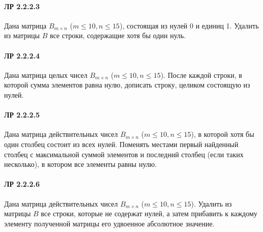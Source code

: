 \documentclass[12pt,a4paper]{report}
\begin{document}
\paragraph*{ЛР 2.2.2.3} Дана матрица $B_{m \times n}$ ($m \le 10, n \le 15$), состоящая из нулей 0 и единиц 1. Удалить из матрицы $B$ все строки, содержащие хотя бы один нуль.
\paragraph*{ЛР 2.2.2.4} Дана матрица целых чисел $B_{m \times n}$ ($m \le 10, n \le 15$). После каждой строки, в которой сумма элементов равна нулю, дописать строку, целиком состоящую из нулей.
\paragraph*{ЛР 2.2.2.5} Дана матрица действительных чисел $B_{m \times n}$ ($m \le 10, n \le 15$), в которой хотя бы один столбец состоит из всех нулей. Поменять местами первый найденный столбец с максимальной суммой элементов и последний столбец (если таких несколько), в котором все элементы равны нулю.
\paragraph*{ЛР 2.2.2.6} Дана матрица действительных чисел $B_{m \times n}$ ($m \le 10, n \le 15$). Удалить из матрицы $B$ все строки, которые не содержат нулей, а затем прибавить к каждому элементу полученной матрицы его удвоенное абсолютное значение.
\end{document}
